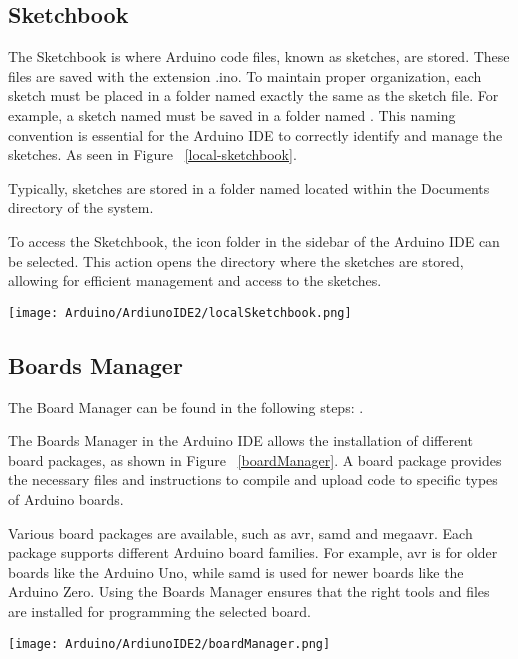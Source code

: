 \subsection{Sketchbook}

The Sketchbook is where Arduino code files, known as sketches, are stored. These files are saved with the  extension .ino. To maintain proper organization, each sketch must be placed in a folder named exactly the same as the sketch file. For example, a sketch named  must be saved in a folder named . This naming convention is essential for the Arduino IDE to correctly identify and manage the sketches. As seen in Figure ~\ref{local-sketchbook}.

Typically, sketches are stored in a folder named  located within the Documents directory of the system.

To access the Sketchbook, the icon folder in the sidebar of the Arduino IDE can be selected. This action opens the directory where the sketches are stored, allowing for efficient management and access to the sketches.


\begin{center}
        \texttt{[image: Arduino/ArdiunoIDE2/localSketchbook.png]}
        \label{local-sketchbook}
\end{center}


\subsection{Boards Manager}
The Board Manager can be found in the following steps: .

The Boards Manager in the Arduino IDE allows the installation of different board packages, as shown in Figure ~\ref{boardManager}.
 A board package provides the necessary files and instructions to compile and upload code to specific types of Arduino boards. 


Various board packages are available, such as avr, samd and megaavr. Each package supports different Arduino board families. For example, avr is for older boards like the Arduino Uno, while samd is used for newer boards like the Arduino Zero. Using the Boards Manager ensures that the right tools and files are installed for programming the selected board. 

\begin{center}
        \texttt{[image: Arduino/ArdiunoIDE2/boardManager.png]}
        \label{boardManager}
\end{center}


